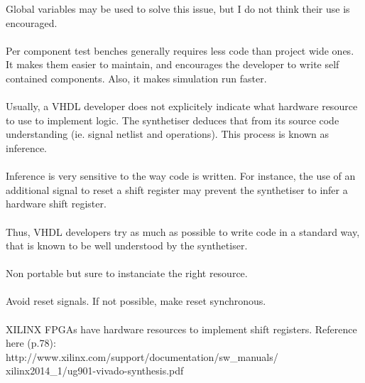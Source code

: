 \documentclass[12pt]{article}
\begin{document}
\todo
{
 Global variables may be used to solve this issue,
 but I do not think their use is encouraged.
}


\paragraph{}
Per component test benches generally requires less code than
project wide ones. It makes them easier to maintain, and
encourages the developer to write self contained components.
Also, it makes simulation run faster.


\paragraph{}
Usually, a VHDL developer does not explicitely indicate what
hardware resource to use to implement logic. The synthetiser
deduces that from its source code understanding (ie. signal
netlist and operations). This process is known as inference.
\paragraph{}
Inference is very sensitive to the way code is written. For
instance, the use of an additional signal to reset a shift
register may prevent the synthetiser to infer a hardware
shift register.
\paragraph{}
Thus, VHDL developers try as much as possible to write code
in a standard way, that is known to be well understood by the
synthetiser.


\paragraph{}
Non portable but sure to instanciate the right resource.


\paragraph{}
Avoid reset signals. If not possible, make reset synchronous.


\paragraph{}
XILINX FPGAs have hardware resources to implement shift registers.
Reference here (p.78):\\
\longurl
{http://www.xilinx.com/support/documentation/sw_manuals/}
{xilinx2014_1/ug901-vivado-synthesis.pdf}
\end{document}
